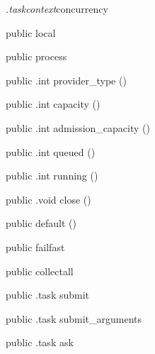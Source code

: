 \begin{CrexxClass}{\textit{.taskcontext}}{concurrency}

  \begin{Hierarchy}
  \end{Hierarchy}

  \begin{Members}

    \Factory
      {public}
      {local}
      {}

    \Factory
      {public}
      {process}
      {}

    \Method
      {public}
      {.int}
      {provider\_type}
      {()}

    \Method
      {public}
      {.int}
      {capacity}
      {()}

    \Method
      {public}
      {.int}
      {admission\_capacity}
      {()}

    \Method
      {public}
      {.int}
      {queued}
      {()}

    \Method
      {public}
      {.int}
      {running}
      {()}

    \Method
      {public}
      {.void}
      {close}
      {()}

    \Factory
      {public}
      {default}
      {()}

    \Factory
      {public}
      {failfast}
      {}

    \Factory
      {public}
      {collectall}
      {}

    \Method
      {public}
      {.task}
      {submit}
      {}

    \Method
      {public}
      {.task}
      {submit\_arguments}
      {}

    \Method
      {public}
      {.task}
      {ask}
      {}


\end{Members}
\end{CrexxClass}
